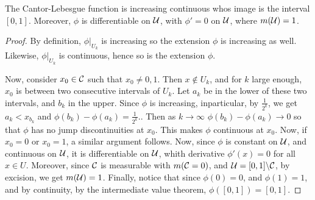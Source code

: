 \begin{lemma}\label{2.5.6}
    The Cantor-Lebesgue function is increasing continuous whos image is the
    interval $[0,1]$. Moreover, $\phi$ is differentiable on $\mathcal{U}$, with
    $\phi'=0$ on  $\mathcal{U}$, where  $m(\mathcal{U})=1$.
\end{lemma}
\begin{proof}
    By definition, $\phi|_{U_k}$ is increasing so the extension $\phi$ is
    increasing as well. Likewise,  $\phi|_{U_k}$ is continuous, hence so is the
    extension $\phi$.

    Now, consider  $x_0 \in \mathcal{C}$ such that  $x_0 \neq 0,1$. Then $x \notin U_k$,
    and for  $k$ large enough,  $x_0$ is between two consecutive intervals of
    $U_k$. Let  $a_k$ be in the lower of these two intervals, and  $b_k$ in the
    upper. Since  $\phi$ is increasing, inparticular, by $\frac{1}{2^k}$, we get
    $a_k<x_b_k$ and $\phi(b_k)-\phi(a_k)=\frac{1}{2^k}$.. Then as $k
    \xrightarrow{} \infty$ $\phi(b_k)-\phi(a_k) \xrightarrow{} 0$ so that $\phi$
    has no jump discontinuities at $x_0$. This makes $\phi$ continuous at
    $x_0$. Now, if $x_0=0$ or $x_0=1$, a similar argument follows. Now, since
    $\phi$ is constant on  $\mathcal{U}$, and continuous on  $\mathcal{U}$, it is differentiable
    on $\mathcal{U}$, whith derivative  $\phi'(x)=0$ for all $x \in U$. Moreover, since
    $\mathcal{C}$ is measurable with $m(\mathcal{C}=0)$, and $\mathcal{U}=[0,1]\backslash\mathcal{C}$, by excision,
    we get $m(\mathcal{U})=1$. Finally, notice that since $\phi(0)=0$, and $\phi(1)=1$, and by
    continuity, by the intermediate value theorem,  $\phi([0,1])=[0,1]$.
\end{proof}

